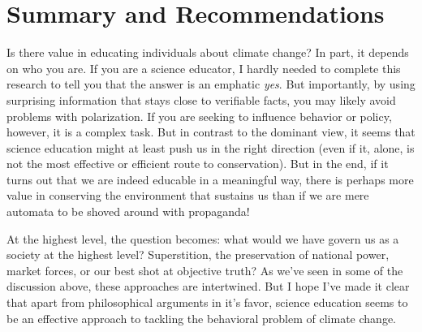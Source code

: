 
\section{Summary and Recommendations}

Is there value in educating individuals about climate change? In part, it
depends on who you are. If you are a science educator, I hardly needed to
complete this research to tell you that the answer is an emphatic \emph{yes}.
But importantly, by using surprising information that stays close to verifiable
facts, you may likely avoid problems with polarization. If you are seeking to
influence behavior or policy, however, it is a complex task.  But in contrast to
the dominant view, it seems that science education might at least push us in the
right direction (even if it, alone, is not the most effective or efficient route
to conservation). But in the end, if it turns out that we are indeed educable in
a meaningful way, there is perhaps more value in conserving the environment that
sustains us than if we are mere automata to be shoved around with propaganda!


At the highest level, the question becomes: what would we have govern us as a
society at the highest level? Superstition, the preservation of national power,
market forces, or our best shot at objective truth? As we've seen in some of the
discussion above, these approaches are intertwined. But I hope I've made it
clear that apart from philosophical arguments in it's favor, science education
seems to be an effective approach to tackling the behavioral problem of climate
change.

